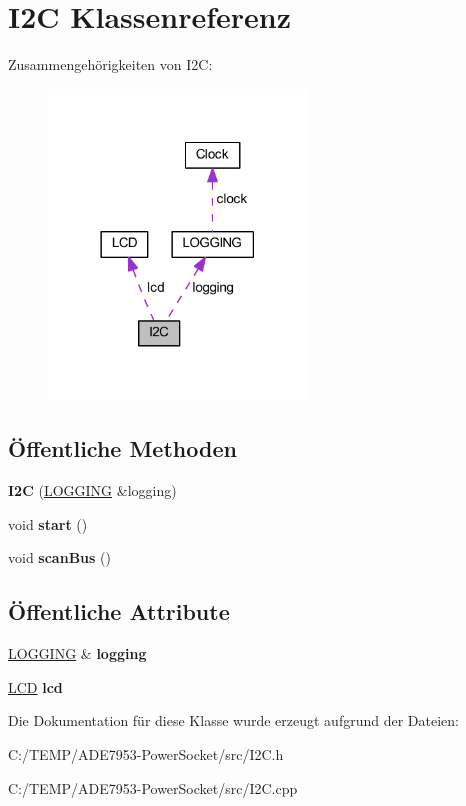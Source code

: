 \hypertarget{class_i2_c}{}\section{I2C Klassenreferenz}
\label{class_i2_c}


Zusammengehörigkeiten von I2C\+:\nopagebreak
\begin{figure}[H]
\begin{center}
\leavevmode
\includegraphics[width=194pt]{class_i2_c__coll__graph}
\end{center}
\end{figure}
\subsection*{Öffentliche Methoden}
\begin{DoxyCompactItemize}
\item 
\mbox{\label{class_i2_c_a54577068652b30b6031442a28fa9a25b}} 
{\bfseries I2C} (\hyperlink{class_l_o_g_g_i_n_g}{L\+O\+G\+G\+I\+NG} \&logging)
\item 
\mbox{\label{class_i2_c_a07463a2babdabbd675a2745fb53650ca}} 
void {\bfseries start} ()
\item 
\mbox{\label{class_i2_c_aa38babf0746e63bc9414ec0665f15b32}} 
void {\bfseries scan\+Bus} ()
\end{DoxyCompactItemize}
\subsection*{Öffentliche Attribute}
\begin{DoxyCompactItemize}
\item 
\mbox{\label{class_i2_c_a8a905521f58afc3afb0ec9fd80f38c27}} 
\hyperlink{class_l_o_g_g_i_n_g}{L\+O\+G\+G\+I\+NG} \& {\bfseries logging}
\item 
\mbox{\label{class_i2_c_afc1d2f3b9b877ce0db0e02a7ea85d42b}} 
\hyperlink{class_l_c_d}{L\+CD} {\bfseries lcd}
\end{DoxyCompactItemize}


Die Dokumentation für diese Klasse wurde erzeugt aufgrund der Dateien\+:\begin{DoxyCompactItemize}
\item 
C\+:/\+T\+E\+M\+P/\+A\+D\+E7953-\/\+Power\+Socket/src/I2\+C.\+h\item 
C\+:/\+T\+E\+M\+P/\+A\+D\+E7953-\/\+Power\+Socket/src/I2\+C.\+cpp\end{DoxyCompactItemize}
